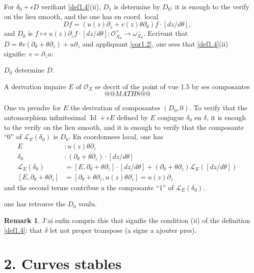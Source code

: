 \documentclass[11pt,a4paper]{article}
\theoremstyle{plain}
\theoremstyle{definition}
\newtheorem{remark}[theorem]{Remark}
\DeclareMathOperator{\Id}{Id}
\begin{document}
For $\delta_0 + \epsilon D$ verifiant \ref{def1.4}(ii), $D_1$ is determine by $D_0$: it is enough to the verify on the lieu smooth, and the one has en coord. local
\[
Df = (u(z)\partial_z + v(z)\theta\partial_\theta)f \cdot [dz/d\theta],
\]
and $D_0$ is $f \mapsto u(z)\partial_z f \cdot [dz/d\theta] : \mathcal{O}_{X_0}^+ \to \omega_{X_0}^-$. Ecrivant that $D = \theta v(\partial_\theta + \theta\partial_z) + u\partial_z$ and appliquant \ref{cor1.2}, one sees that \ref{def1.4}(ii) signifie: $v = \partial_z u$:

$D_0$ determine $D$.

\newpage

A derivation impaire $E$ of $\mathcal{O}_X$ se decrit of the point of vue 1.5 by ses composantes
\[
@@MATH8@@
\]

One va prendre for $E$ the derivation of composantes $(D_0, 0)$. To verify that the automorphism infinitesimal $\Id + \epsilon E$ defined by $E$ conjugue $\delta_0$ en $\delta$, it is enough to the verify on the lieu smooth, and it is enough to verify that the composante ``0'' of $\mathcal{L}_E(\delta_0)$ is $D_0$. En coordonnees local, one has
\[
\begin{aligned}
E &: u(z)\theta\partial_z \\
\delta_0 &: (\partial_\theta + \theta\partial_z) \cdot [dz/d\theta] \\
\mathcal{L}_E(\delta_0) &= [E, \partial_\theta + \theta\partial_z] \cdot [dz/d\theta] + (\partial_\theta + \theta\partial_z) \mathcal{L}_E([dz/d\theta]) \\
[E, \partial_\theta + \theta\partial_z] &= [\partial_\theta + \theta\partial_z, u(z)\theta\partial_z] = u(z)\partial_z
\end{aligned}
\]
and the second terme contribue a the composante ``1'' of $\mathcal{L}_E(\delta_0)$.

one has retrouve the $D_0$ voulu.

\begin{remark}\label{rem1.8}
J'ai enfin compris this that signifie the condition (ii) of the definition \ref{def1.4}: that $\delta$ let not proper transpose (a signe a ajouter pres).
\end{remark}

\newpage

\section*{2. Curves stables}
\end{document}
